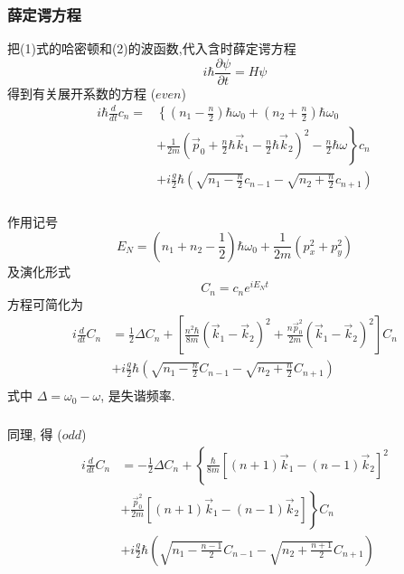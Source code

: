     \begin{frame} 
    \frametitle{薛定谔方程}
        把(1)式的哈密顿和(2)的波函数,代入含时薛定谔方程
        \[ i \hbar \frac{\partial \psi}{\partial t} = H \psi \]
        得到有关展开系数的方程 ($even$)
        \[ \begin{aligned}
            i \hbar \frac{d  }{d t} c_n = & \left\{ \left( n_1 - \frac{n}{2} \right) \hbar \omega_0  + \left( n_2 + \frac{n}{2} \right) \hbar \omega_0  \right.\\ 
            & + \left. \frac{1}{2m} \left(\vec{p}_0 +\frac{n}{2} \hbar \vec{k}_1 - \frac{n}{2}\hbar \vec{k}_2\right)^2 -  \frac{n}{2} \hbar \omega \right\} c_n \\
            & + i \frac{g}{2} \hbar \left( \sqrt{n_1 - \frac{n}{2}} c_{n-1} -\sqrt{n_2 + \frac{n}{2}} c_{n+1}
            \right)
        \end{aligned}\] 
    \end{frame}

    \begin{frame} 
    \frametitle{}
         作用记号
         \[ E_N = \left( n_1 + n_2 -\frac{1}{2} \right) \hbar \omega_0 + \frac{1}{2m} (p^2 _x + p^2 _y)\]
         及演化形式
         \[C_n = c_n e ^{iE_N t}\]
         方程可简化为
         \[ \begin{aligned}
            i  \frac{d  }{d t} C_n &= \frac{1}{2} \Delta C_n + \left[ \frac{n^2 \hbar }{8m} ( \vec{k}_1 - \vec{k}_2)^2  + \frac{n \vec{p}_0 ^2 }{2m} ( \vec{k}_1 - \vec{k}_2)^2 
            \right] C_n\\
            & + i \frac{g}{2} \hbar \left( \sqrt{n_1 - \frac{n}{2}} C_{n-1} -\sqrt{n_2 + \frac{n}{2}} C_{n+1}
            \right)  \\
         \end{aligned}\] 
         式中 $\Delta = \omega_0 - \omega$, 是失谐频率.
    \end{frame}

    \begin{frame} 
    \frametitle{}
         同理, 得 ($odd$) 
         \[ \begin{aligned}
            i  \frac{d  }{d t} C_n &= - \frac{1}{2} \Delta C_n + \left\{ \frac{\hbar }{8m} [(n+1) \vec{k}_1 - (n-1)\vec{k}_2]^2 \right. \\ 
            & \left. + \frac{\vec{p}_0 ^2 }{2m} [ (n+1) \vec{k}_1 - (n-1) \vec{k}_2]  
            \right\} C_n\\
            & + i \frac{g}{2} \hbar \left( \sqrt{n_1 - \frac{n-1}{2}} C_{n-1} -\sqrt{n_2 + \frac{n+1}{2}} C_{n+1}
            \right)  \\
         \end{aligned}\] 
    \end{frame}

